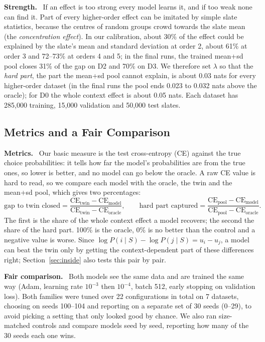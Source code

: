 \documentclass[11pt,a4paper]{article}
\numberwithin{table}{section}
\numberwithin{figure}{section}
\numberwithin{equation}{section}
\newcommand{\para}[1]{\textbf{#1}\ }
\begin{document}
\para{Strength.} If an effect is too strong every model learns it, and if too weak none can find it. Part of every higher-order effect can be imitated by simple slate statistics, because the centres of random groups crowd towards the slate mean (the \emph{concentration effect}). In our calibration, about 30\% of the effect could be explained by the slate's mean and standard deviation at order 2, about 61\% at order 3 and 72--73\% at orders 4 and 5; in the final runs, the trained mean+sd pool closes 31\% of the gap on D2 and 70\% on D3. We therefore set $\lambda$ so that the \emph{hard part}, the part the mean+sd pool cannot explain, is about 0.03 nats for every higher-order dataset (in the final runs the pool ends 0.023 to 0.032 nats above the oracle); for D0 the whole context effect is about 0.05 nats. Each dataset has 285,000 training, 15,000 validation and 50,000 test slates.

\subsection{Metrics and a Fair Comparison}\label{sec:fair}
\para{Metrics.} Our basic measure is the test cross-entropy (CE) against the true choice probabilities: it tells how far the model's probabilities are from the true ones, so lower is better, and no model can go below the oracle. A raw CE value is hard to read, so we compare each model with the oracle, the twin and the mean+sd pool, which gives two percentages:
\begin{equation}
\text{gap to twin closed}=\frac{\mathrm{CE}_{\text{twin}}-\mathrm{CE}_{\text{model}}}{\mathrm{CE}_{\text{twin}}-\mathrm{CE}_{\text{oracle}}},\qquad
\text{hard part captured}=\frac{\mathrm{CE}_{\text{pool}}-\mathrm{CE}_{\text{model}}}{\mathrm{CE}_{\text{pool}}-\mathrm{CE}_{\text{oracle}}}.
\end{equation}
The first is the share of the whole context effect a model recovers; the second the share of the hard part. 100\% is the oracle, 0\% is no better than the control and a negative value is worse. Since $\log P(i\mid S)-\log P(j\mid S)=u_i-u_j$, a model can beat the twin only by getting the context-dependent part of these differences right; Section~\ref{sec:inside} also tests this pair by pair.

\para{Fair comparison.} Both models see the same data and are trained the same way (Adam, learning rate $10^{-3}$ then $10^{-4}$, batch 512, early stopping on validation loss). Both families were tuned over 22 configurations in total on 7 datasets, choosing on seeds 100--104 and reporting on a separate set of 30 seeds (0--29), to avoid picking a setting that only looked good by chance. We also ran size-matched controls and compare models seed by seed, reporting how many of the 30 seeds each one wins.
\end{document}
